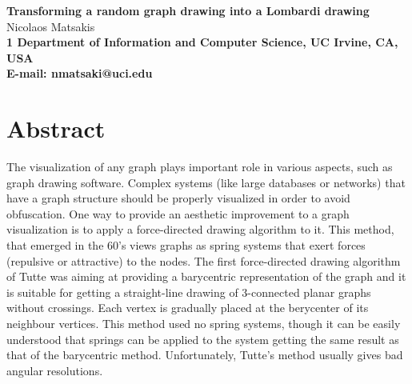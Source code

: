 \documentclass[10pt]{article}
\date{}
\begin{document}
\begin{flushleft}
{\Large
\textbf{Transforming a random graph drawing into a Lombardi drawing}
}
\\
Nicolaos Matsakis
\\
\bf{1} Department of Information and Computer Science, UC Irvine, CA, USA
\\
 E-mail: nmatsaki@uci.edu
\end{flushleft}

\section*{Abstract}



The visualization of any graph plays important role in various aspects, such as graph drawing software. Complex systems (like large databases or networks) that have a graph structure should be properly visualized in order to avoid obfuscation. One way to provide an aesthetic improvement to a graph visualization is to apply a force-directed drawing algorithm to it. This method, that emerged in the 60's views graphs as spring systems that exert forces (repulsive or attractive) to the nodes. The first force-directed drawing algorithm of Tutte \cite{Tut63} was aiming at providing a barycentric representation of the graph and it is suitable  for getting a straight-line drawing of 3-connected planar graphs without crossings. Each vertex is gradually placed at the berycenter of its neighbour vertices. This method used no spring systems, though it can be easily understood that springs can be applied to the system getting the same result as that of the barycentric method. Unfortunately, Tutte's method usually gives bad angular resolutions.
\end{document}
